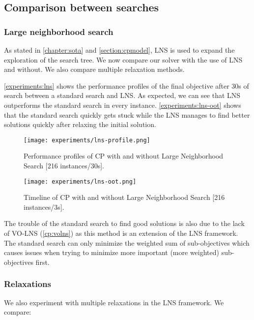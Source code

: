 \documentclass[../../thesis.tex]{subfiles}
\begin{document}
\subsection{Comparison between searches}

\subsubsection{Large neighborhood search}


As stated in \autoref{chapter:sota} and \autoref{section:cpmodel}, LNS is used to expand the exploration
of the search tree. We now compare our solver with the use of LNS and without. We also compare multiple 
relaxation methods.


\autoref{experiments:lns} shows the performance profiles of the final objective after 30s of search 
between a standard search and LNS. As expected, we can see that LNS outperforms the standard search 
in every instance. 
\autoref{experiments:lns-oot} shows that the standard search quickly gets stuck
while the LNS manages to find better solutions quickly after relaxing the initial solution.

\begin{figure}
  \centering
  \texttt{[image: experiments/lns-profile.png]}
  \caption{Performance profiles of CP with and without Large Neighborhood Search [216 instances/30s].}
  \label{experiments:lns}
\end{figure}


\begin{figure}
  \centering
  \texttt{[image: experiments/lns-oot.png]}
  \caption{Timeline of CP with and without Large Neighborhood Search [216 instances/3s].}
  \label{experiments:lns-oot}
\end{figure}


The trouble of the standard search to find good solutions is also due to the lack of VO-LNS (\autoref{cp:volns}) as 
this method is an extension of the LNS framework. The standard search can only minimize the weighted sum of sub-objectives
which causes issues when trying to minimize more important (more weighted) sub-objectives first.


\subsubsection{Relaxations}

We also experiment with multiple relaxations in the LNS framework. We compare:
\end{document}
